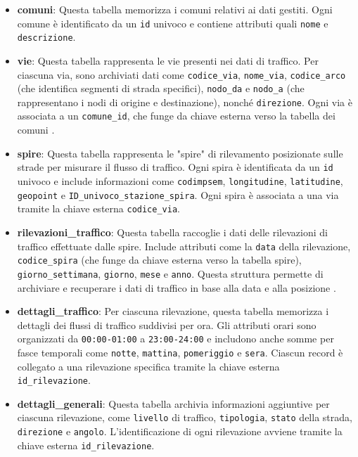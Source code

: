 \begin{itemize}
    \item \textbf{comuni}: Questa tabella memorizza i comuni relativi ai dati gestiti. Ogni comune è identificato da un \texttt{id} univoco e contiene attributi quali \texttt{nome} e \texttt{descrizione}.
    
    \item \textbf{vie}: Questa tabella rappresenta le vie presenti nei dati di traffico. Per ciascuna via, sono archiviati dati come \texttt{codice\_via}, \texttt{nome\_via}, \texttt{codice\_arco} (che identifica segmenti di strada specifici), \texttt{nodo\_da} e \texttt{nodo\_a} (che rappresentano i nodi di origine e destinazione), nonché \texttt{direzione}. Ogni via è associata a un \texttt{comune\_id}, che funge da chiave esterna verso la tabella dei comuni \cite{elmasri2016fundamentals}.

    \item \textbf{spire}: Questa tabella rappresenta le "spire" di rilevamento posizionate sulle strade per misurare il flusso di traffico. Ogni spira è identificata da un \texttt{id} univoco e include informazioni come \texttt{codimpsem}, \texttt{longitudine}, \texttt{latitudine}, \texttt{geopoint} e \texttt{ID\_univoco\_stazione\_spira}. Ogni spira è associata a una via tramite la chiave esterna \texttt{codice\_via}.

    \item \textbf{rilevazioni\_traffico}: Questa tabella raccoglie i dati delle rilevazioni di traffico effettuate dalle spire. Include attributi come la \texttt{data} della rilevazione, \texttt{codice\_spira} (che funge da chiave esterna verso la tabella spire), \texttt{giorno\_settimana}, \texttt{giorno}, \texttt{mese} e \texttt{anno}. Questa struttura permette di archiviare e recuperare i dati di traffico in base alla data e alla posizione \cite{silberschatz2020database}.

    \item \textbf{dettagli\_traffico}: Per ciascuna rilevazione, questa tabella memorizza i dettagli dei flussi di traffico suddivisi per ora. Gli attributi orari sono organizzati da \texttt{00:00-01:00} a \texttt{23:00-24:00} e includono anche somme per fasce temporali come \texttt{notte}, \texttt{mattina}, \texttt{pomeriggio} e \texttt{sera}. Ciascun record è collegato a una rilevazione specifica tramite la chiave esterna \texttt{id\_rilevazione}.

    \item \textbf{dettagli\_generali}: Questa tabella archivia informazioni aggiuntive per ciascuna rilevazione, come \texttt{livello} di traffico, \texttt{tipologia}, \texttt{stato} della strada, \texttt{direzione} e \texttt{angolo}. L’identificazione di ogni rilevazione avviene tramite la chiave esterna \texttt{id\_rilevazione}.
\end{itemize}

